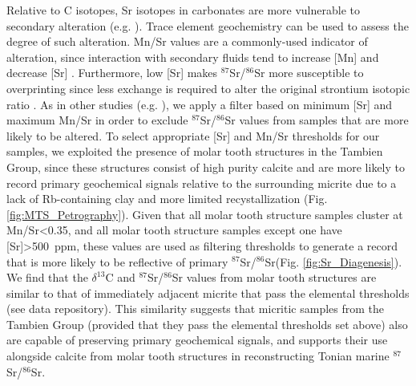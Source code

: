 \documentclass[11pt,letterpaper]{article}
\newcommand{\dC}{$\delta^{13}$C\xspace}
\newcommand{\SrSr}{$^{87}$Sr/$^{86}$Sr\xspace}
\begin{document}
Relative to C isotopes, Sr isotopes in carbonates are more vulnerable to secondary alteration (e.g. \citealp{Banner1990a}). Trace element geochemistry can be used to assess the degree of such alteration. Mn/Sr values are a commonly-used indicator of alteration, since interaction with secondary fluids tend to increase [Mn] and decrease [Sr] \citep{Brand1980a, Banner1990a, Jacobsen1999a}. Furthermore, low [Sr] makes \SrSr more susceptible to overprinting since less exchange is required to alter the original strontium isotopic ratio \citep{Brand1980a, Veizer1989a, Banner1990a}. As in other studies (e.g. \citealp{Halverson2007b}), we apply a filter based on minimum [Sr] and maximum Mn/Sr in order to exclude \SrSr values from samples that are more likely to be altered. To select appropriate [Sr] and Mn/Sr thresholds for our samples, we exploited the presence of molar tooth structures in the Tambien Group, since these structures consist of high purity calcite and are more likely to record primary geochemical signals relative to the surrounding micrite due to a lack of Rb-containing clay and more limited recystallization (Fig. \ref{fig:MTS_Petrography}). Given that all molar tooth structure samples cluster at Mn/Sr\textless0.35, and all molar tooth structure samples except one have [Sr]\textgreater500~ppm, these values are used as filtering thresholds to generate a record that is more likely to be reflective of primary \SrSr (Fig. \ref{fig:Sr_Diagenesis}). We find that the \dC and \SrSr values from molar tooth structures are similar to that of immediately adjacent micrite that pass the elemental thresholds (see data repository). This similarity suggests that micritic samples from the Tambien Group (provided that they pass the elemental thresholds set above) also are capable of preserving primary geochemical signals, and supports their use alongside calcite from molar tooth structures in reconstructing Tonian marine \SrSr.
\end{document}
